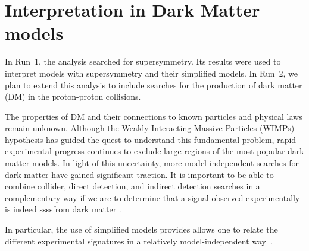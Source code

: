 \section{Interpretation in Dark Matter models}
\label{sec:darkmatter}

In Run~1, the \alphat analysis searched for supersymmetry. Its results
were used to interpret models with supersymmetry and their simplified
models. In Run~2, we plan to extend this analysis to include searches
for the production of dark matter (DM) in the proton-proton collisions.

The properties of DM and their connections to known particles and
physical laws remain unknown. Although the Weakly Interacting Massive
Particles (WIMPs) hypothesis has guided the quest to understand this
fundamental problem, rapid experimental progress continues to exclude
large regions of the most popular dark matter models. In light of this
uncertainty, more model-independent searches for dark matter have gained
significant traction. It is important to be able to combine collider,
direct detection, and indirect detection searches in a complementary way
if we are to determine that a signal observed experimentally is indeed
ssssfrom dark matter \cite{Bauer:2013ihz}.

In particular, the use of simplified models provides allows one to relate the different experimental
signatures in a relatively model-independent way~\cite{Buchmueller:2014yoa}. 




